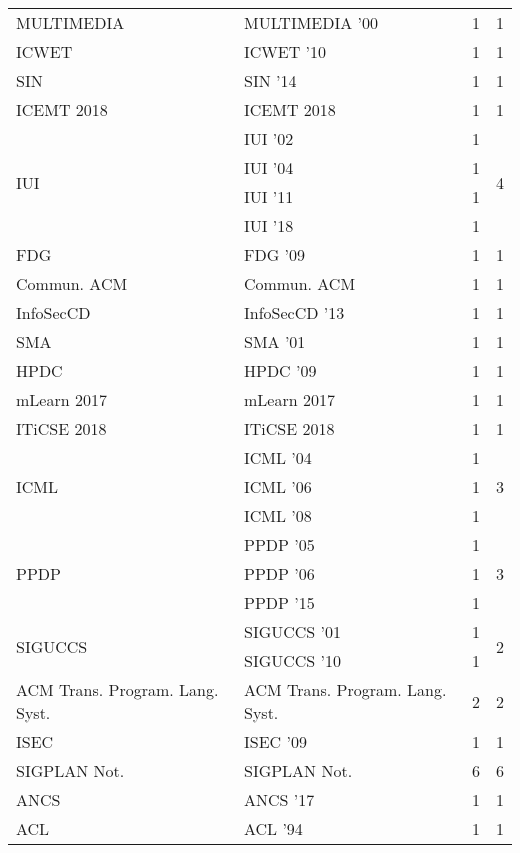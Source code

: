 \begin{table*}[t]
\begin{tabular}{llrr}
\multirow{1}{*}{MULTIMEDIA } & MULTIMEDIA '00 & 1 & \multirow{1}{*}{1}\\
\multirow{1}{*}{ICWET } & ICWET '10 & 1 & \multirow{1}{*}{1}\\
\multirow{1}{*}{SIN } & SIN '14 & 1 & \multirow{1}{*}{1}\\
\multirow{1}{*}{ICEMT 2018} & ICEMT 2018 & 1 & \multirow{1}{*}{1}\\
\multirow{4}{*}{IUI } & IUI '02 & 1 & \multirow{4}{*}{4}\\
& IUI '04 & 1 &\\
& IUI '11 & 1 &\\
& IUI '18 & 1 &\\
\multirow{1}{*}{FDG } & FDG '09 & 1 & \multirow{1}{*}{1}\\
\multirow{1}{*}{Commun. ACM} & Commun. ACM & 1 & \multirow{1}{*}{1}\\
\multirow{1}{*}{InfoSecCD } & InfoSecCD '13 & 1 & \multirow{1}{*}{1}\\
\multirow{1}{*}{SMA } & SMA '01 & 1 & \multirow{1}{*}{1}\\
\multirow{1}{*}{HPDC } & HPDC '09 & 1 & \multirow{1}{*}{1}\\
\multirow{1}{*}{mLearn 2017} & mLearn 2017 & 1 & \multirow{1}{*}{1}\\
\multirow{1}{*}{ITiCSE 2018} & ITiCSE 2018 & 1 & \multirow{1}{*}{1}\\
\multirow{3}{*}{ICML } & ICML '04 & 1 & \multirow{3}{*}{3}\\
& ICML '06 & 1 &\\
& ICML '08 & 1 &\\
\multirow{3}{*}{PPDP } & PPDP '05 & 1 & \multirow{3}{*}{3}\\
& PPDP '06 & 1 &\\
& PPDP '15 & 1 &\\
\multirow{2}{*}{SIGUCCS } & SIGUCCS '01 & 1 & \multirow{2}{*}{2}\\
& SIGUCCS '10 & 1 &\\
\multirow{1}{*}{ACM Trans. Program. Lang. Syst.} & ACM Trans. Program. Lang. Syst. & 2 & \multirow{1}{*}{2}\\
\multirow{1}{*}{ISEC } & ISEC '09 & 1 & \multirow{1}{*}{1}\\
\multirow{1}{*}{SIGPLAN Not.} & SIGPLAN Not. & 6 & \multirow{1}{*}{6}\\
\multirow{1}{*}{ANCS } & ANCS '17 & 1 & \multirow{1}{*}{1}\\
\multirow{1}{*}{ACL } & ACL '94 & 1 & \multirow{1}{*}{1}\\

\end{tabular}
\end{table*}
